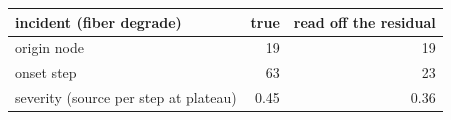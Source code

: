 \begin{center}\small\begin{tabular}{@{}lrr@{}}\toprule incident (fiber degrade) & true & read off the residual \\ \midrule
origin node & 19 & 19 \\
onset step & 63 & 23 \\
severity (source per step at plateau) & 0.45 & 0.36 \\
\bottomrule\end{tabular}\end{center}
